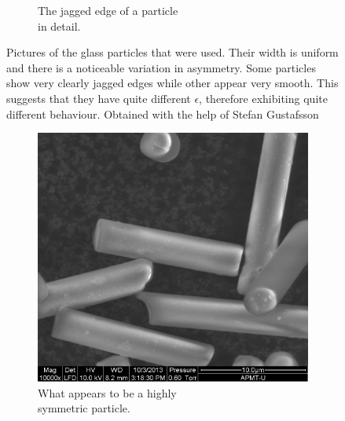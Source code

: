\begin{figure}[H]
\begin{subfigure}[3b]{0.40\textwidth}
\caption{The jagged edge of a particle \\ in detail.}
\end{subfigure}
\caption{Pictures of the glass particles that were used. Their width is uniform and there is a noticeable variation in asymmetry. Some particles show very clearly jagged edges while other appear very smooth. This suggests that they have quite different $\epsilon$, therefore exhibiting quite different behaviour. Obtained with the help of Stefan Gustafsson}
\label{fig:particlepictures}
\end{figure}
 
\begin{figure}[H]
\centering
\begin{subfigure}[3a]{0.40\textwidth}
\includegraphics[width=\textwidth]{figures/method/symmetric.png}
\caption{What appears to be a highly \\ symmetric particle.}\label{fig:symmetricparticle}
\end{subfigure}\hspace{1em}%
\begin{subfigure}[3b]{0.40\textwidth}

\end{subfigure}
\end{figure}
